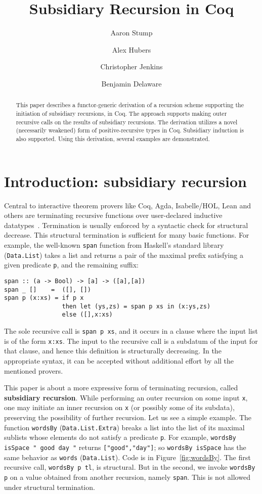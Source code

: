 \documentclass[a4paper,USenglish]{lipics-v2021}
\title{Subsidiary Recursion in Coq} %
\author{Aaron Stump}{Computer Science Dept., The University of Iowa, USA \and \url{http://www.cs.uiowa.edu/~astump/}}{aaron-stump@uiowa.edu}{http://orcid.org/0000-0002-9720-0003}{}%
\author{Alex Hubers}{Computer Science, The University of Iowa, USA}{alexander-hubers@uiowa.edu}{}{}
\author{Christopher Jenkins}{Computer Science, The University of Iowa, USA}{alexander-hubers@uiowa.edu}{http://orcid.org/
0000-0002-5434-5018}{}
\author{Benjamin Delaware}{Computer Science, Purdue University, USA \and \url{https://www.cs.purdue.edu/homes/bendy/}}{bendy@purdue.edu}{}{}
\begin{document}
\maketitle

\begin{abstract}
  This paper describes a functor-generic derivation of a recursion
  scheme supporting the initiation of subsidiary recursions, in Coq.
  The approach supports making outer recursive calls on the results of
  subsidiary recursions.  The derivation utilizes a novel (necessarily
  weakened) form of positive-recursive types in Coq.  Subsidiary
  induction is also supported.  Using this derivation, several
  examples are demonstrated.
\end{abstract}

\section{Introduction: subsidiary recursion}

Central to interactive theorem provers like Coq, Agda, Isabelle/HOL,
Lean and others are terminating recursive functions over user-declared
inductive datatypes~\cite{agda,coq,isabelle-hol,lean}.  Termination is
usually enforced by a syntactic check for structural decrease.  This
structural termination is sufficient for many basic functions.  For
example, the well-known \texttt{span} function from Haskell's standard
library (\verb|Data.List|) takes a list and returns a pair of the
maximal prefix satisfying a given predicate \verb|p|, and the
remaining suffix:
\begin{verbatim}
span :: (a -> Bool) -> [a] -> ([a],[a])
span _ []    =  ([], [])
span p (x:xs) = if p x
                then let (ys,zs) = span p xs in (x:ys,zs)
                else ([],x:xs)
\end{verbatim}
\noindent The sole recursive call is \verb|span p xs|, and it occurs
in a clause where the input list is of the form \verb|x:xs|.  The
input to the recursive call is a subdatum of the input for that
clause, and hence this definition is structurally decreasing.  In the
appropriate syntax, it can be accepted without additional effort by
all the mentioned provers.

This paper is about a more expressive form of terminating recursion,
called \textbf{subsidiary recursion}.  While performing an outer
recursion on some input \verb|x|, one may initiate an inner recursion
on \verb|x| (or possibly some of its subdata), preserving the
possibility of further recursion.  Let us see a simple example.  The
function \verb|wordsBy| (\verb|Data.List.Extra|) breaks a list into
the list of its maximal sublists whose elements do not satisfy a
predicate \verb|p|.  For example, \verb|wordsBy isSpace " good day "|
returns \verb|["good","day"]|; so \verb|wordsBy isSpace| has the same
behavior as \verb|words| (\verb|Data.List|).  Code is in
Figure~\ref{fig:wordsBy}. The first recursive call,
\verb|wordsBy p tl|, is structural.  But in the second, we invoke
\verb|wordsBy p| on a value obtained from another recursion, namely
\verb|span|.  This is not allowed under structural termination.
\end{document}
